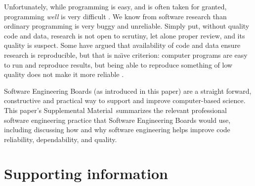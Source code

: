\documentclass[10pt,letterpaper]{article}
\def\supplement{Supplemental Material}
\begin{document}
Unfortunately, while programming is easy, and is often taken for granted, programming \emph{well\/} is very difficult \cite{fixit}. We know from software research than ordinary programming is very buggy and unreliable. Simply put, without quality code and data, research is not open to scrutiny, let alone proper review, and its quality is suspect. Some have argued that availability of code and data ensure research is reproducible, but that is na\"\i ve criterion:  computer programs are easy to run and reproduce results, but being able to reproduce something of low quality does not make it more reliable \cite{reproducibility,relit,popper}. 

Software Engineering Boards (as introduced in this paper) are a straight forward, constructive and practical way to support and improve computer-based science. This paper's \supplement\ summarizes the relevant professional software engineering practice that Software Engineering Boards would use, including discussing how and why software engineering helps improve code reliability, dependability, and quality.

\section*{Supporting information}
\newcount\csrefcount {}
\def\csref{\global\advance\csrefcount by 1}
\def\ethics#1{\paragraph*{Ethics}#1}
\def\ack#1{\paragraph*{Acknowledgments}#1}
\def\dataaccess#1{\paragraph*{Data and code access}#1}
\def\aucontribute#1{\paragraph*{Author contribution}#1}
\def\competing#1{\paragraph*{Competing interests}#1}
\def\funding#1{\paragraph*{Funding}#1}
\end{document}
